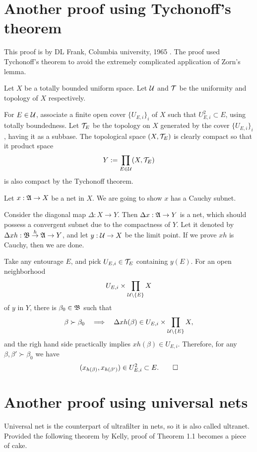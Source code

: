 \documentclass{../exp}
\begin{document}
\section{Another proof using Tychonoff's theorem}
This proof is by DL Frank, Columbia university, 1965 \cite{frank1965totally}.
The proof used Tychonoff's theorem to avoid the extremely complicated application of Zorn's lemma.

\begin{pf}[2 of Theorem 1.1]
Let $X$ be a totally bounded uniform space.
Let $\mathcal{U}$ and $\mathcal{T}$ be the uniformity and topology of $X$ respectively.

For $E\in\mathcal{U}$, associate a finite open cover $\{U_{E,i}\}_i$ of $X$ such that $U_{E,i}^2\subset E$, using totally boundedness.
Let $\mathcal{T}_E$ be the topology on $X$ generated by the cover $\{U_{E,i}\}_i$, having it as a subbase.
The topological space $(X,\mathcal{T}_E)$ is clearly compact so that it product space
\[Y:=\prod_{E\in\mathcal{U}}(X,\mathcal{T}_E)\]
is also compact by the Tychonoff theorem.

Let $x:\fA\to X$ be a net in $X$.
We are going to show $x$ has a Cauchy subnet.

Consider the diagonal map $\Delta:X\to Y$.
Then $\Delta x:\fA\to Y$ is a net, which should possess a convergent subnet due to the compactness of $Y$.
Let it denoted by $\Delta xh:\fB\to{h}\fA\to Y$, and let $y:\cU\to X$ be the limit point.
If we prove $xh$ is Cauchy, then we are done.

Take any entourage $E$, and pick $U_{E,i}\in\mathcal{T}_E$ containing $y(E)$.
For an open neighborhood
\[U_{E,i}\times\prod_{\mathcal{U}\setminus\{E\}}X\]
of $y$ in $Y$, there is $\beta_0\in\mathfrak{B}$ such that
\[\beta\succ\beta_0\impl\Delta xh(\beta)\in U_{E,i}\x\prod_{\cU\setminus\{E\}}X,\]
and the righ hand side practically implies $xh(\beta)\in U_{E,i}$.
Therefore, for any $\beta,\beta'\succ\beta_0$ we have
\[(x_{h(\beta)},x_{h(\beta')})\in U_{E,i}^2\subset E.\qedhere\]
\end{pf}







\section{Another proof using universal nets}

Universal net is the counterpart of ultrafilter in nets, so it is also called ultranet.
Provided the following theorem by Kelly, proof of Theorem 1.1 becomes a piece of cake.
\end{document}
